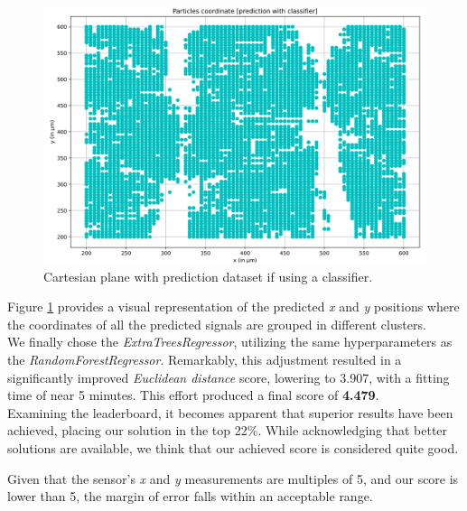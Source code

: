 \documentclass[conference]{IEEEtran}
\begin{document}
\begin{figure}[htbp]
\centerline{\includegraphics[width=\linewidth]{media/plot_prediction_classifier.png}}
\caption{Cartesian plane with prediction dataset if using a classifier.}
\label{fig:cartesian_plane_prediction_classifier}
\end{figure}

Figure \ref{fig:cartesian_plane_prediction_classifier} provides a visual 
representation of the predicted \textit{x} and \textit{y} positions where the 
coordinates of all the predicted signals are grouped in different clusters.\\

We finally chose the \textit{ExtraTreesRegressor}, utilizing 
the same hyperparameters as the \textit{RandomForestRegressor}. Remarkably, this adjustment 
resulted in a significantly improved \textit{Euclidean distance} score, lowering to 3.907, with a 
fitting time of near 5 minutes. This effort produced a final score of \textbf{4.479}.\\

Examining the leaderboard, it becomes apparent that superior results have been achieved,
placing our solution in the top 22\%. While acknowledging that better solutions are 
available, we think that our achieved score is considered quite good. 

Given that the sensor's \textit{x} and \textit{y}
measurements are multiples of 5, 
and our score is lower than 5, the margin of error falls within an acceptable range.\\\\



\end{document}
